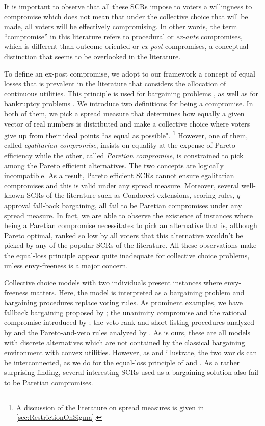 \documentclass[version=3.21, pagesize, twoside=off, bibliography=totoc, DIV=calc, fontsize=12pt, a4paper]{scrartcl}
\begin{document}
It is important to observe that all these \acp{SCR} impose to voters a willingness to compromise which does not mean that under the collective choice that will be made, all voters will be effectively compromising. In other words, the term “compromise” in this literature refers to procedural or \textit{ex-ante} compromises, which is different than outcome oriented or \textit{ex-post} compromises, a conceptual distinction that seems to be overlooked in the literature.

To define an ex-post compromise, we adopt to our framework a concept of equal losses that is prevalent in the literature that considers the allocation of continuous utilities. This principle is used for bargaining problems \citep{Chun1988}, \citep{Chun1991} as well as for bankruptcy problems \citep{Herrero2001}. 
We introduce two definitions for being a compromise. In both of them, we pick a spread measure that determines how equally a given vector of real numbers is distributed and make a collective choice where voters give up from their ideal points “as equal as possible". \footnote{A discussion of the literature on spread measures is given in \cref{sec:RestrictionOnSigma}.} However, one of them, called \textit{egalitarian compromise}, insists on equality at the expense of Pareto efficiency while the other, called \textit{Paretian compromise}, is constrained to pick among the Pareto efficient alternatives. 
The two concepts are logically incompatible. As a result, Pareto efficient \acp{SCR} cannot ensure egalitarian compromises and this is valid under any spread measure. Moreover, several well-known \acp{SCR} of the literature such as Condorcet extensions, scoring rules, $q-$approval fall-back bargaining, all fail to be Paretian compromises under any spread measure. In fact, we are able to observe the existence of instances where being a Paretian compromise necessitates to pick an alternative that is, although Pareto optimal, ranked so low by all voters that this alternative wouldn't be picked by any of the popular \acp{SCR} of the literature. All these observations make the equal-loss principle appear quite inadequate for collective choice problems, unless envy-freeness is a major concern.

Collective choice models with two individuals present instances where envy-freeness matters. Here, the model is interpreted as a bargaining problem and bargaining procedures replace voting rules. As prominent examples, we have fallback bargaining proposed by \citet{Brams2001}; the unanimity compromise and the rational compromise introduced by \citet{Kibris2007}; the veto-rank and short listing procedures analyzed by \citet{Clippel2014} and the Pareto-and-veto rules analyzed by \citet{Laslier2020}. As is ours, these are all models with discrete alternatives which are not contained by the classical \citet{Nash1950} bargaining environment with convex utilities. However, as \citet{Mariotti1998} and \citet{Nagahisa2002} illustrate, the two worlds can be interconnected, as we do for the equal-loss principle of \citet{Chun1988} and \citet{Chun1991}. As a rather surprising finding, several interesting \acp{SCR} used as a bargaining solution also fail to be Paretian compromises.
\end{document}
